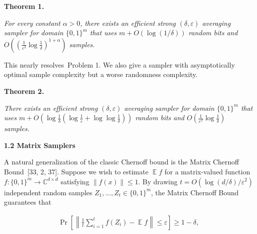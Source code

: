 \documentclass[10pt,a4paper]{article}
\begin{document}


\par\medskip\noindent\textbf{
\textbf{Theorem 1}\textbf{.}
}\par



\emph{For every constant $\alpha>0$, there exists an efficient strong $(\delta,\varepsilon)$ averaging sampler for domain $\{0,1\}^{m}$ that uses $m+O(\log(1/\delta))$ random bits and $O((\frac{1}{\varepsilon^{2}}\log\frac{1}{\delta})^{1+\alpha})$ samples.}\par







This nearly resolves Problem 1. We also give a sampler with asymptotically optimal sample complexity but a worse randomness complexity.\par





\par\medskip\noindent\textbf{
\textbf{Theorem 2}\textbf{.}
}\par



\emph{There exists an efficient strong $(\delta,\varepsilon)$ averaging sampler for domain $\{0,1\}^{m}$ that uses $m+O(\log\frac{1}{\delta}(\log\frac{1}{\varepsilon}+\log\log\frac{1}{\delta}))$ random bits and $O(\frac{1}{\varepsilon^{2}}\log\frac{1}{\delta})$ samples.}\par







\par\medskip\noindent\textbf{
1.2 Matrix Samplers}\par




A natural generalization of the classic Chernoff bound is the Matrix Chernoff Bound [33, 2, 37]. Suppose we wish to estimate $\operatorname*{\mathbb{E}}f$ for a matrix-valued function $f:\{0,1\}^{m}\to\mathbb{C}^{d\times d}$ satisfying $\left\lVert f(x)\right\rVert\leq 1$.
By drawing $t=O(\log(d/\delta)/\varepsilon^{2})$ independent random samples $Z_{1},\dots,Z_{t}\in\{0,1\}^{m}$, the
Matrix Chernoff Bound guarantees that\par


\[\begin{gathered}
\Pr\left[\left\lVert\frac{1}{t}\sum_{i=1}^{t}f(Z_{i})-\operatorname*{\mathbb{E}}f\right\rVert\leq\varepsilon\right]\geq 1-\delta,
\end{gathered}\]
\end{document}
